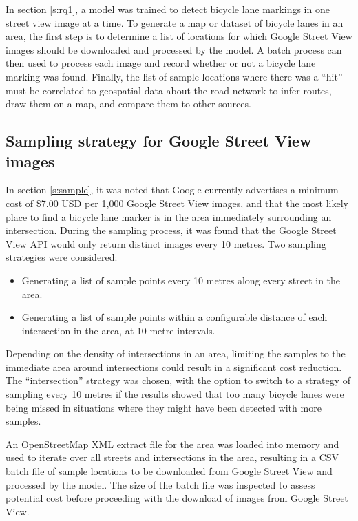\documentclass[11pt,twoside]{report}
\begin{document}
In section \ref{s:rq1}, a model was trained to detect bicycle lane markings in one street view image at a time.  To generate a map or dataset of bicycle lanes in an area, the first step is to determine a list of locations for which Google Street View images should be downloaded and processed by the model.  A batch process can then used to process each image and record whether or not a bicycle lane marking was found.  Finally, the list of sample locations where there was a ``hit'' must be correlated to geospatial data about the road network to infer routes, draw them on a map, and compare them to other sources.


\subsection{Sampling strategy for Google Street View images}
\label{s:rq2a}

In section \ref{s:sample}, it was noted that Google currently advertises a minimum cost of \$7.00 USD per 1,000 Google Street View images, and that the most likely place to find a bicycle lane marker is in the area immediately surrounding an intersection.  During the sampling process, it was found that the Google Street View API would only return distinct images every 10 metres.  Two sampling strategies were considered:
\begin{itemize}
\item{Generating a list of sample points every 10 metres along every street in the area.}
\item{Generating a list of sample points within a configurable distance of each intersection in the area, at 10 metre intervals.	}
\end{itemize}

Depending on the density of intersections in an area, limiting the samples to the immediate area around intersections could result in a significant cost reduction.  The ``intersection'' strategy was chosen, with the option to switch to a strategy of sampling every 10 metres if the results showed that too many bicycle lanes were being missed in situations where they might have been detected with more samples.

An OpenStreetMap XML extract file for the area was loaded into memory and used to iterate over all streets and intersections in the area, resulting in a CSV batch file of sample locations to be downloaded from Google Street View and processed by the model.  The size of the batch file was inspected to assess potential cost before proceeding with the download of images from Google Street View.
\end{document}
